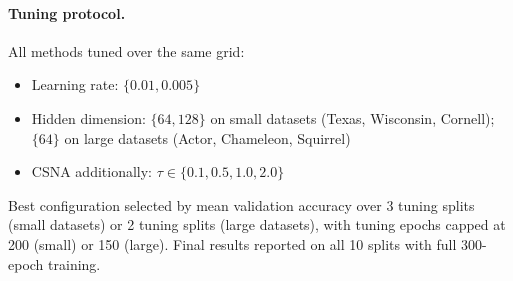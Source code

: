 \documentclass[runningheads]{llncs}
\begin{document}
\paragraph{Tuning protocol.} All methods tuned over the same grid:
\begin{itemize}
    \item Learning rate: $\{0.01, 0.005\}$
    \item Hidden dimension: $\{64, 128\}$ on small datasets (Texas, Wisconsin, Cornell); $\{64\}$ on large datasets (Actor, Chameleon, Squirrel)
    \item CSNA additionally: $\tau \in \{0.1, 0.5, 1.0, 2.0\}$
\end{itemize}
Best configuration selected by mean validation accuracy over 3 tuning splits (small datasets) or 2 tuning splits (large datasets), with tuning epochs capped at 200 (small) or 150 (large).
Final results reported on all 10 splits with full 300-epoch training.
\end{document}
